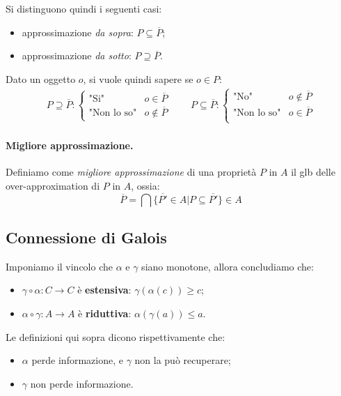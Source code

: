 \documentclass[a4paper, 10pt]{article}
\begin{document}
	Si distinguono quindi i seguenti casi:
	\begin{itemize}
		\item approssimazione \textit{da sopra}: $P \subseteq \overline{P}$;
		\item approssimazione \textit{da sotto}: $P \supseteq \overline{P}$.
	\end{itemize}
	
	Dato un oggetto $o$, si vuole quindi sapere se $o \in P$:
	\begin{align*}
		P \supseteq \overline{P}: \begin{cases}
			\text{"Si"} &o \in \overline{P} \\
			\text{"Non lo so"} &o \notin  \overline{P}
		\end{cases} \qquad
		P \subseteq \overline{P}: \begin{cases}
		\text{"No"} &o \notin \overline{P} \\
		\text{"Non lo so"} &o \in \overline{P}\\
		\end{cases}
	\end{align*} 
	
	\paragraph{Migliore approssimazione.}
	Definiamo come \textit{migliore approssimazione} di una proprietà $P$ in $A$ il glb delle over-approximation di $P$ in $A$, ossia: \[  \overline{P} = \bigcap \lbrace \overline{P'} \in A | P \subseteq \overline{P'} \rbrace \in A \]
	
	\subsection{Connessione di Galois}
	Imponiamo il vincolo che $\alpha$ e $\gamma$ siano monotone, allora concludiamo che: \begin{itemize}
		\item $\gamma \circ \alpha: C \to C$ è \textbf{estensiva}: $\gamma(\alpha(c)) \geq c$;
		\item $\alpha \circ \gamma : A \to A$ è \textbf{riduttiva}: $\alpha(\gamma(a)) \leq a$.
	\end{itemize}

	Le definizioni qui sopra dicono rispettivamente che:
	\begin{itemize}
		\item $\alpha$ perde informazione, e $\gamma$ non la può recuperare;
		\item $\gamma$ non perde informazione.
	\end{itemize}
\end{document}
